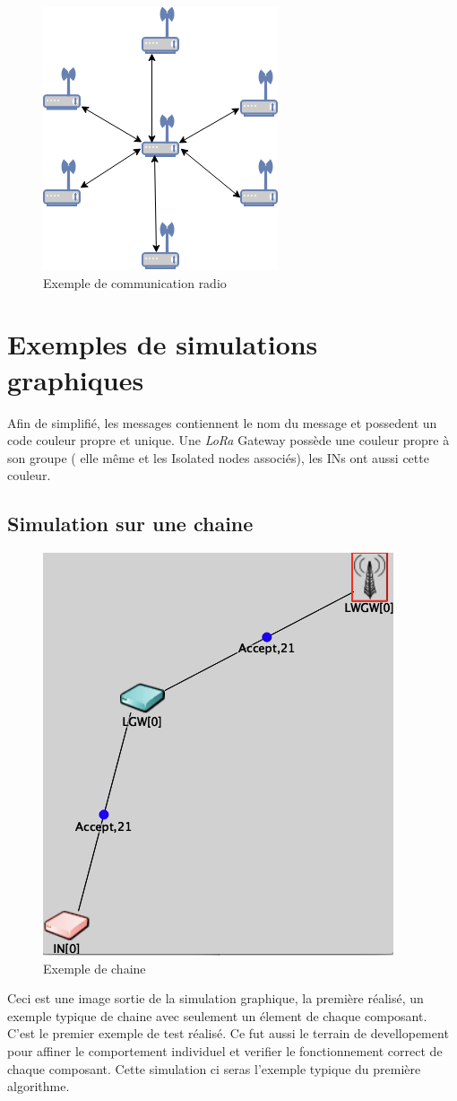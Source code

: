 \begin{figure}[!ht]
\centering
\includegraphics[scale=0.9]{ex_radio.png} 
\caption{Exemple de communication radio}
\end{figure}


\newpage
\section{Exemples de simulations graphiques}
Afin de simplifié, les messages contiennent le nom du message et possedent un code couleur propre et unique. Une \textit{LoRa} Gateway possède une couleur propre à son groupe ( elle même et les Isolated nodes associés), les INs ont aussi cette couleur.
\subsection{Simulation sur une chaine}
\begin{figure}[!ht]
\centering
\includegraphics[scale=0.6]{chaine.png} 
\caption{Exemple de chaine}
\end{figure}
Ceci est une image sortie de la simulation graphique, la première réalisé, un exemple typique de chaine avec seulement un élement de chaque composant. C'est le premier exemple de test réalisé. Ce fut aussi le terrain de devellopement pour affiner le comportement individuel et verifier le fonctionnement correct de chaque composant. Cette simulation ci seras l'exemple typique du première algorithme.
\newpage
